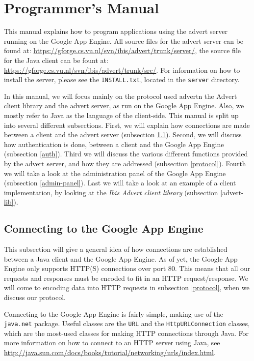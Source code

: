 \section{Programmer's Manual}
\label{progman}
This manual explains how to program applications using the advert server running
on the Google App Engine. All source files for the advert server can be found at:
\url{https://gforge.cs.vu.nl/svn/ibis/advert/trunk/server/}, the source file for
the Java client can be fount at:
\url{https://gforge.cs.vu.nl/svn/ibis/advert/trunk/src/}. For information on how
to install the server, please see the \texttt{INSTALL.txt}, located in the
\texttt{server} directory.

In this manual, we will focus mainly on the protocol used advertn the Advert
client library and the advert server, as run on the Google App Engine. Also, we
mostly refer to Java as the language of the client-side. This manual is split up
into several different subsections. First, we will explain how connections are
made between a client and the advert server (subsection \ref{http-java}). Second,
we will discuss how authentication is done, between a client and the Google App
Engine (subsection \ref{auth}). Third we will discuss the various different
functions provided by the advert server, and how they are addressed (subsection
\ref{protocol}). Fourth we will take a look at the administration panel of the
Google App Engine (subsection \ref{admin-panel}). Last we will take a look at an
example of a client implementation, by looking at the \emph{Ibis Advert client
library} (subsection \ref{advert-lib}).


\subsection{Connecting to the Google App Engine}
\label{http-java}
This subsection will give a general idea of how connections are established
between a Java client and the Google App Engine. As of yet, the Google App
Engine only supports HTTP(S) connections over port 80. This means that all our
requests and responses must be encoded to fit in an HTTP request/response. We
will come to encoding data into HTTP requests in subsection \ref{protocol}, when
we discuss our protocol.

Connecting to the Google App Engine is fairly simple, making use of the
\texttt{java.net} package. Useful classes are the \texttt{URL} and the
\texttt{HttpURLConnection} classes, which are the most-used classes for making
HTTP connections through Java. For more information on how to connect to an
HTTP server using Java, see
\url{http://java.sun.com/docs/books/tutorial/networking/urls/index.html}.

